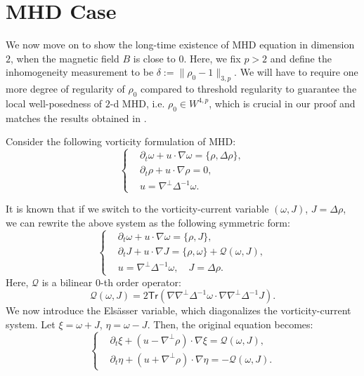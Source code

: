 \documentclass[12pt,letterpaper]{article}
\theoremstyle{plain}
\begin{document}
\section{MHD Case}
We now move on to show the long-time existence of MHD equation in dimension $2$, when the magnetic field $B$ is close to $0$. Here, we fix $p>2$ and define the inhomogeneity measurement to be $\delta:=\lVert \rho_0-1\rVert_{3,p}$. We will have to require one more degree of regularity of $\rho_0$ compared to threshold regularity to guarantee the local well-posedness of $2$-d MHD, i.e. $\rho_0\in W^{4,p}$, which is crucial in our proof and matches the results obtained in \cite{CobbFanelli2023}. 

Consider the following vorticity formulation of MHD:
\begin{equation}\label{MHD Vorticity}
\left\{
\begin{aligned}
&\partial_t\omega+u\cdot\nabla\omega=\{\rho,\Delta\rho\},\\
&\partial_t\rho+u\cdot\nabla\rho=0,\\
&u=\nabla^\perp\Delta^{-1}\omega.
\end{aligned}
\right.
\end{equation}

It is known that if we switch to the vorticity-current variable $(\omega, J)$, $J=\Delta\rho$, we can rewrite the above system as the following symmetric form:
\begin{equation}\label{MHD Vorticity-Current}
\left\{
\begin{aligned}
&\partial_t\omega+u\cdot\nabla\omega=\{\rho, J\},\\
&\partial_t J+u\cdot\nabla J=\{\rho,\omega\}+\mathscr Q(\omega,J),\\
&u=\nabla^\perp\Delta^{-1}\omega,\quad J=\Delta\rho.
\end{aligned}
\right.
\end{equation}
Here, $\mathscr Q$ is a bilinear $0$-th order operator:
\begin{equation*}
\mathscr  Q(\omega,J)=2\mathsf{Tr}(\nabla\nabla^\perp\Delta^{-1}\omega\cdot \nabla\nabla^\perp \Delta^{-1}J)    .
\end{equation*}
We now introduce the Els\"asser variable, which diagonalizes the vorticity-current system. Let $\xi=\omega+J$, $\eta=\omega-J$. Then, the original equation becomes:
\begin{equation}\label{Elsasser System}
\left\{
\begin{aligned}
&\partial_t\xi+(u-\nabla^\perp\rho)\cdot\nabla\xi=\mathscr  Q(\omega,J),\\
&\partial_t \eta+(u+\nabla^\perp\rho)\cdot\nabla \eta=-\mathscr  Q(\omega,J).
\end{aligned}
\right.
\end{equation}
\end{document}
